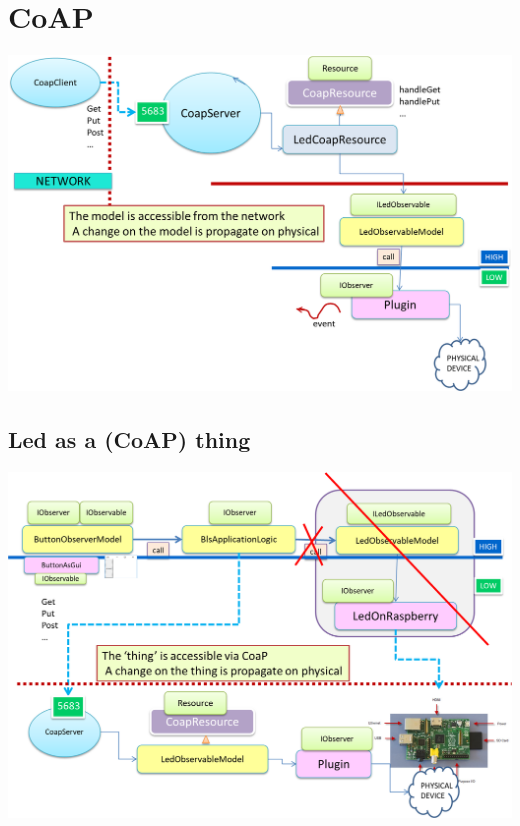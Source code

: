\documentclass[10pt,a4paper,openright,twoside]{../llncs}
\begin{document}

\newpage 
\section{CoAP}
 
\medskip 
\includegraphics[scale = 0.5]{img/bls18/bls18Coap0.png}



\subsection{Led as a (CoAP) thing }

\medskip 
\includegraphics[scale = 0.5]{img/bls18/bls18CoapBL.png}


 
\end{document}

